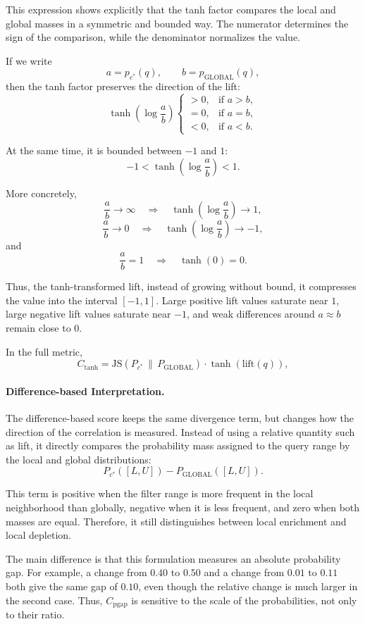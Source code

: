 This expression shows explicitly that the tanh factor compares the local and global masses in a symmetric and bounded way.
The numerator determines the sign of the comparison, while the denominator normalizes the value.

If we write
\[
a = p_{c^*}(q),
\qquad
b = p_{\mathrm{GLOBAL}}(q),
\]
then the tanh factor preserves the direction of the lift:
\[
\tanh\left(\log \frac{a}{b}\right)
\begin{cases}
> 0, & \text{if } a > b,\\
= 0, & \text{if } a = b,\\
< 0, & \text{if } a < b.
\end{cases}
\]

At the same time, it is bounded between $-1$ and $1$:
\[
-1
<
\tanh\left(\log \frac{a}{b}\right)
<
1.
\]

More concretely,
\[
\frac{a}{b} \to \infty
\quad \Rightarrow \quad
\tanh\left(\log \frac{a}{b}\right) \to 1,
\]
\[
\frac{a}{b} \to 0
\quad \Rightarrow \quad
\tanh\left(\log \frac{a}{b}\right) \to -1,
\]
and
\[
\frac{a}{b} = 1
\quad \Rightarrow \quad
\tanh(0)=0.
\]

Thus, the tanh-transformed lift, instead of growing without bound, it compresses the value into the interval $[-1,1]$.
Large positive lift values saturate near $1$, large negative lift values saturate near $-1$, and weak differences around $a \approx b$ remain close to $0$.

In the full metric,
\[
C_{\tanh}
=
\mathrm{JS}(P_{c^*} \,\|\, P_{\mathrm{GLOBAL}})
\cdot
\tanh(\mathrm{lift}(q)),
\]

\paragraph{Difference-based Interpretation.}
The difference-based score keeps the same divergence term, but changes how the direction of the correlation is measured.
Instead of using a relative quantity such as lift, it directly compares the probability mass assigned to the query range by the local and global distributions:
\[
P_{c^*}([L,U]) - P_{\mathrm{GLOBAL}}([L,U]).
\]

This term is positive when the filter range is more frequent in the local neighborhood than globally, negative when it is less frequent, and zero when both masses are equal.
Therefore, it still distinguishes between local enrichment and local depletion.

The main difference is that this formulation measures an absolute probability gap.
For example, a change from $0.40$ to $0.50$ and a change from $0.01$ to $0.11$ both give the same gap of $0.10$, even though the relative change is much larger in the second case.
Thus, $C_{\mathrm{pgap}}$ is sensitive to the scale of the probabilities, not only to their ratio.

